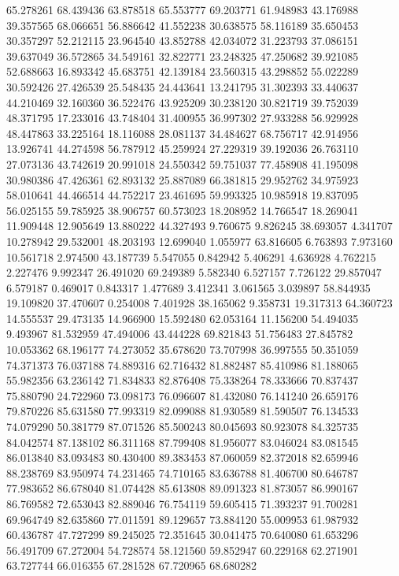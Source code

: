 65.278261
68.439436
63.878518
65.553777
69.203771
61.948983
43.176988
39.357565
68.066651
56.886642
41.552238
30.638575
58.116189
35.650453
30.357297
52.212115
23.964540
43.852788
42.034072
31.223793
37.086151
39.637049
36.572865
34.549161
32.822771
23.248325
47.250682
39.921085
52.688663
16.893342
45.683751
42.139184
23.560315
43.298852
55.022289
30.592426
27.426539
25.548435
24.443641
13.241795
31.302393
33.440637
44.210469
32.160360
36.522476
43.925209
30.238120
30.821719
39.752039
48.371795
17.233016
43.748404
31.400955
36.997302
27.933288
56.929928
48.447863
33.225164
18.116088
28.081137
34.484627
68.756717
42.914956
13.926741
44.274598
56.787912
45.259924
27.229319
39.192036
26.763110
27.073136
43.742619
20.991018
24.550342
59.751037
77.458908
41.195098
30.980386
47.426361
62.893132
25.887089
66.381815
29.952762
34.975923
58.010641
44.466514
44.752217
23.461695
59.993325
10.985918
19.837095
56.025155
59.785925
38.906757
60.573023
18.208952
14.766547
18.269041
11.909448
12.905649
13.880222
44.327493
9.760675
9.826245
38.693057
4.341707
10.278942
29.532001
48.203193
12.699040
1.055977
63.816605
6.763893
7.973160
10.561718
2.974500
43.187739
5.547055
0.842942
5.406291
4.636928
4.762215
2.227476
9.992347
26.491020
69.249389
5.582340
6.527157
7.726122
29.857047
6.579187
0.469017
0.843317
1.477689
3.412341
3.061565
3.039897
58.844935
19.109820
37.470607
0.254008
7.401928
38.165062
9.358731
19.317313
64.360723
14.555537
29.473135
14.966900
15.592480
62.053164
11.156200
54.494035
9.493967
81.532959
47.494006
43.444228
69.821843
51.756483
27.845782
10.053362
68.196177
74.273052
35.678620
73.707998
36.997555
50.351059
74.371373
76.037188
74.889316
62.716432
81.882487
85.410986
81.188065
55.982356
63.236142
71.834833
82.876408
75.338264
78.333666
70.837437
75.880790
24.722960
73.098173
76.096607
81.432080
76.141240
26.659176
79.870226
85.631580
77.993319
82.099088
81.930589
81.590507
76.134533
74.079290
50.381779
87.071526
85.500243
80.045693
80.923078
84.325735
84.042574
87.138102
86.311168
87.799408
81.956077
83.046024
83.081545
86.013840
83.093483
80.430400
89.383453
87.060059
82.372018
82.659946
88.238769
83.950974
74.231465
74.710165
83.636788
81.406700
80.646787
77.983652
86.678040
81.074428
85.613808
89.091323
81.873057
86.990167
86.769582
72.653043
82.889046
76.754119
59.605415
71.393237
91.700281
69.964749
82.635860
77.011591
89.129657
73.884120
55.009953
61.987932
60.436787
47.727299
89.245025
72.351645
30.041475
70.640080
61.653296
56.491709
67.272004
54.728574
58.121560
59.852947
60.229168
62.271901
63.727744
66.016355
67.281528
67.720965
68.680282
